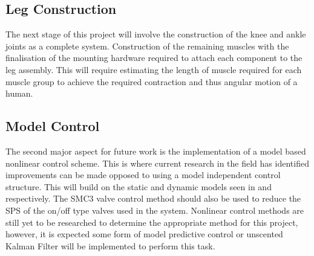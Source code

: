 \documentclass[11pt,a4paper]{article}
\begin{document}
\subsection{Leg Construction}
\label{sub:leg_construction}
The next stage of this project will involve the construction of the knee and ankle joints as a complete system. Construction of the remaining muscles with the finalisation of the mounting hardware required to attach each component to the leg assembly. This will require estimating the length of muscle required for each muscle group to achieve the required contraction and thus angular motion of a human.

\subsection{Model Control}
\label{sub:mpc_implementation}
The second major aspect for future work is the implementation of a model based nonlinear control scheme. This is where current research in the field has identified improvements can be made opposed to using a model independent control structure. This will build on the static and dynamic models seen in \cite{martens_boblan_2017} and \cite{hosovsky_2012} respectively. The SMC3 \cite{zhang_bone_2018} valve control method should also be used to reduce the SPS of the on/off type valves used in the system. Nonlinear control methods are still yet to be researched to determine the appropriate method for this project, however, it is expected some form of model predictive control or unscented Kalman Filter will be implemented to perform this task.
\end{document}

